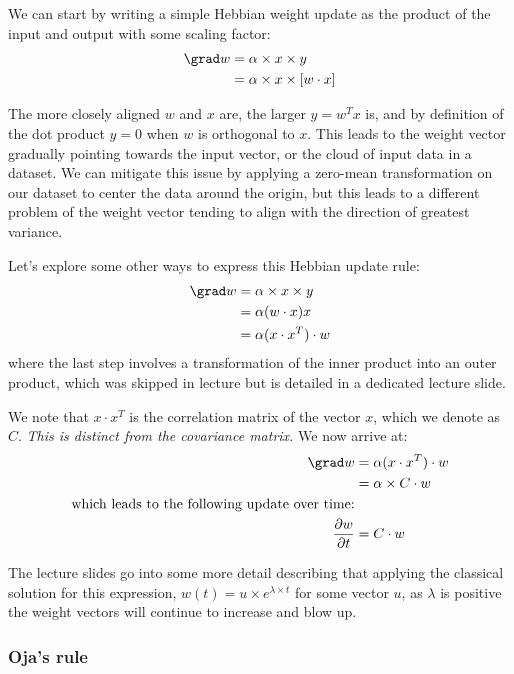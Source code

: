 \documentclass[main]{subfiles}
\begin{document}
We can start by writing a simple Hebbian weight update as the product of the input and output with some scaling factor:
\begin{align}
    \grad w &= \alpha \times x \times y\\
        &= \alpha \times x \times [w \cdot x]\\
\end{align}

The more closely aligned $w$ and $x$ are, the larger $y = w^T x$ is, and by definition of the dot product $y = 0$ when $w$ is orthogonal to $x$. This leads to the weight vector gradually pointing towards the input vector, or the cloud of input data in a dataset. We can mitigate this issue by applying a zero-mean transformation on our dataset to center the data around the origin, but this leads to a different problem of the weight vector tending to align with the direction of greatest variance.

Let's explore some other ways to express this Hebbian update rule:
\begin{align}
    \grad w &= \alpha \times x \times y\\
        &= \alpha (w \cdot x) x\\
        &= \alpha (x \cdot x^T) \cdot w
\end{align}
where the last step involves a transformation of the inner product into an outer product, which was skipped in lecture but is detailed in a dedicated lecture slide.

We note that $x \cdot x^T$ is the correlation matrix of the vector $x$, which we denote as $C$. \textit{This is distinct from the covariance matrix.} We now arrive at:
\begin{align}
    \grad w &= \alpha (x \cdot x^T) \cdot w\\
        &= \alpha \times C \cdot w\\
    \text{which leads to the following update over time:}\\
    \frac{\partial w}{\partial t} &= C \cdot w
\end{align}

The lecture slides go into some more detail describing that applying the classical solution for this expression, $w(t) = u \times e^{\lambda \times t}$ for some vector $u$, as $\lambda$ is positive the weight vectors will continue to increase and blow up.

\subsubsection{Oja's rule}
\end{document}
